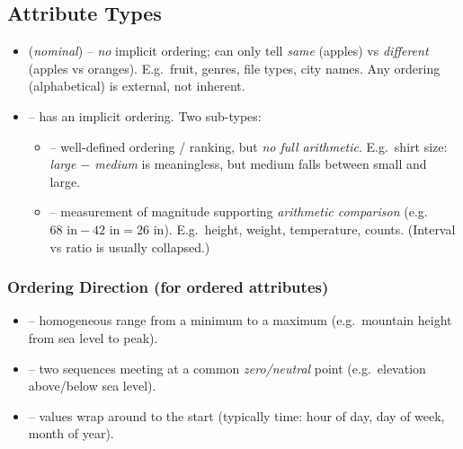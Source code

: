\subsection{Attribute Types}

\begin{center}
\end{center}

\begin{itemize}
  \item {} (\emph{nominal}) -- \emph{no} implicit ordering; can only tell \emph{same} (apples) vs \emph{different} (apples vs oranges). E.g.\ fruit, genres, file types, city names. Any ordering (alphabetical) is external, not inherent.
  \item {} -- has an implicit ordering. Two sub-types:
  \begin{itemize}
    \item {} -- well-defined ordering / ranking, but \emph{no full arithmetic}. E.g.\ shirt size: \emph{large $-$ medium} is meaningless, but medium falls between small and large.
    \item {} -- measurement of magnitude supporting \emph{arithmetic comparison} (e.g.\ $68\text{ in}-42\text{ in}=26\text{ in}$). E.g.\ height, weight, temperature, counts. (Interval vs ratio is usually collapsed.)
  \end{itemize}
\end{itemize}

\subsubsection{Ordering Direction (for ordered attributes)}
\begin{itemize}
  \item {} -- homogeneous range from a minimum to a maximum (e.g.\ mountain height from sea level to peak).
  \item {} -- two sequences meeting at a common \emph{zero/neutral} point (e.g.\ elevation above/below sea level).
  \item {} -- values wrap around to the start (typically time: hour of day, day of week, month of year).
\end{itemize}

